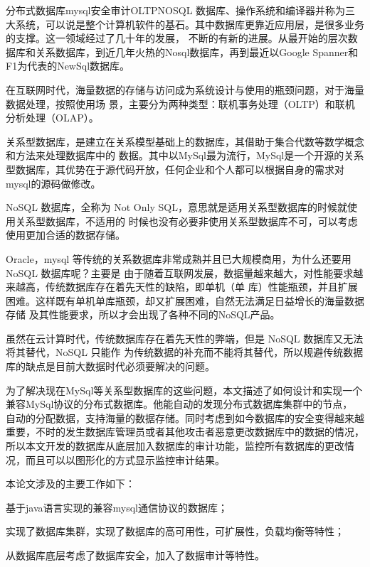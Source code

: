 
\begin{Cabstract}{分布式数据库}{mysql}{安全审计}{OLTP}{NOSQL}
数据库、操作系统和编译器并称为三大系统，可以说是整个计算机软件的基石。其中数据库更靠近应用层，是很多业务的支撑。这一领域经过了几十年的发展，
不断的有新的进展。从最开始的层次数据库和关系数据库，到近几年火热的Nosql数据库，再到最近以Google Spanner和F1为代表的NewSql数据库。

在互联网时代，海量数据的存储与访问成为系统设计与使用的瓶颈问题，对于海量数据处理，按照使用场
景，主要分为两种类型：联机事务处理（OLTP）和联机分析处理（OLAP）。

关系型数据库，是建立在关系模型基础上的数据库，其借助于集合代数等数学概念和方法来处理数据库中的
数据。其中以MySql最为流行，MySql是一个开源的关系型数据库，其优势在于源代码开放，任何企业和个人都可以根据自身的需求对mysql的源码做修改。

NoSQL 数据库，全称为 Not Only SQL，意思就是适用关系型数据库的时候就使用关系型数据库，不适用的
时候也没有必要非使用关系型数据库不可，可以考虑使用更加合适的数据存储。

Oracle，mysql 等传统的关系数据库非常成熟并且已大规模商用，为什么还要用 NoSQL 数据库呢？主要是
由于随着互联网发展，数据量越来越大，对性能要求越来越高，传统数据库存在着先天性的缺陷，即单机（单
库）性能瓶颈，并且扩展困难。这样既有单机单库瓶颈，却又扩展困难，自然无法满足日益增长的海量数据存储
及其性能要求，所以才会出现了各种不同的NoSQL产品。

虽然在云计算时代，传统数据库存在着先天性的弊端，但是 NoSQL 数据库又无法将其替代，NoSQL 只能作
为传统数据的补充而不能将其替代，所以规避传统数据库的缺点是目前大数据时代必须要解决的问题。

为了解决现在MySql等关系型数据库的这些问题，本文描述了如何设计和实现一个兼容MySql协议的分布式数据库。他能自动的发现分布式数据库集群中的节点，
自动的分配数据，支持海量的数据存储。同时考虑到如今数据库的安全变得越来越重要，不时的发生数据库管理员或者其他攻击者恶意更改数据库中的数据的情况，
所以本文开发的数据库从底层加入数据库的审计功能，监控所有数据库的更改情况，而且可以以图形化的方式显示监控审计结果。

本论文涉及的主要工作如下：

\hspace{8mm}基于java语言实现的兼容mysql通信协议的数据库；

\hspace{8mm}实现了数据库集群，实现了数据库的高可用性，可扩展性，负载均衡等特性；

\hspace{8mm}从数据库底层考虑了数据库安全，加入了数据审计等特性。
\end{Cabstract}
